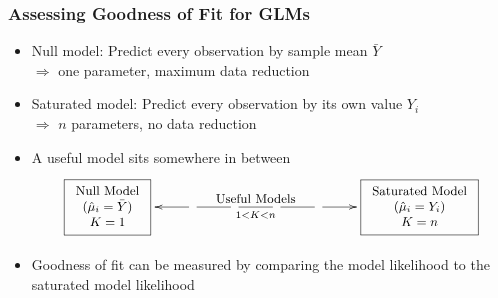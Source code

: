 \documentclass{beamer}
\begin{document}
\begin{frame}
\frametitle{Assessing Goodness of Fit for GLMs}
  \begin{itemize}
    \item Null model: Predict every observation by sample mean $\bar Y$ \\
      $\Rightarrow$ one parameter, maximum data reduction
    \item \alert{Saturated model}: Predict every observation by its own value $Y_i$ \\
      $\Rightarrow$ $n$ parameters, no data reduction
    \item A useful model sits somewhere in between
\medskip
\begin{displaymath}\ShowOutlines
    \xymatrix{ \fbox{\small  $\begin{array}{c} \text{Null Model} \\
                                  (\hat\mu_i = \bar{Y}) \\
                                  K = 1 \end{array}$} \ar@{<-}[r]
                    & \ar@{-}[r]
                    & \ar@{-}[r]^{\text{{\small Useful Models}}}_{1 < K < n}
                    & \ar@{-}[r]
                    & \ar@{->}[r]
                    & \fbox{\small  $\begin{array}{c} \text{Saturated Model} \\
                                         (\hat\mu_i = Y_i) \\
                                         K = n \end{array}$} }
\end{displaymath}
\medskip
\pause
   \item Goodness of fit can be measured by comparing the model likelihood
      to the saturated model likelihood
\end{itemize}
\end{frame}
\end{document}
